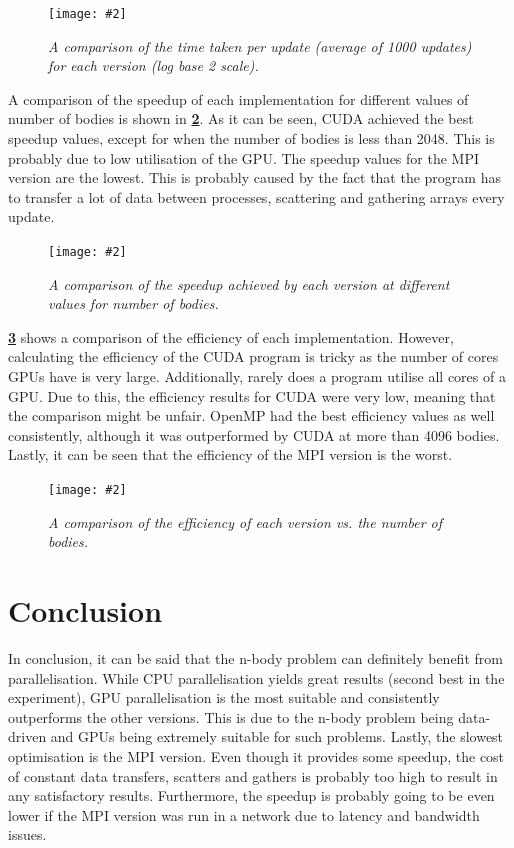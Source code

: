 \documentclass[12pt, a4paper]{article}
\newcommand{\figuremacro}[5]{
    \begin{figure}[#1]
        \centering
        \caption[#3]{\textbf{#3}#4}
        \texttt{[image: \#2]}
        \label{fig:#2}
    \end{figure}
}
\begin{document}
    \figuremacro{h}{avg_times}{}{\small{\textit{A comparison of the time taken per update (average of 1000 updates) for each version (log base 2 scale).}}}{1}    

    A comparison of the speedup of each implementation for different values of number of bodies is shown in \textbf{\cref{fig:speedup}}. As it can be seen, CUDA achieved the best speedup values, except for when the number of bodies is less than 2048. This is probably due to low utilisation of the GPU. The speedup values for the MPI version are the lowest. This is probably caused by the fact that the program has to transfer a lot of data between processes, scattering and gathering arrays every update.

    \figuremacro{h}{speedup}{}{\small{\textit{A comparison of the speedup achieved by each version at different values for number of bodies.}}}{1}    

    \textbf{\cref{fig:efficiency}} shows a comparison of the efficiency of each implementation. However, calculating the efficiency of the CUDA program is tricky as the number of cores GPUs have is very large. Additionally, rarely does a program utilise all cores of a GPU. Due to this, the efficiency results for CUDA were very low, meaning that the comparison might be unfair. OpenMP had the best efficiency values as well consistently, although it was outperformed by CUDA at more than 4096 bodies. Lastly, it can be seen that the efficiency of the MPI version is the worst.

    \figuremacro{h}{efficiency}{}{\small{\textit{A comparison of the efficiency of each version vs. the number of bodies.}}}{1}

    \section{Conclusion}
    In conclusion, it can be said that the n-body problem can definitely benefit from parallelisation. While CPU parallelisation yields great results (second best in the experiment), GPU parallelisation is the most suitable and consistently outperforms the other versions. This is due to the n-body problem being data-driven and GPUs being extremely suitable for such problems. Lastly, the slowest optimisation is the MPI version. Even though it provides some speedup, the cost of constant data transfers, scatters and gathers is probably too high to result in any satisfactory results. Furthermore, the speedup is probably going to be even lower if the MPI version was run in a network due to latency and bandwidth issues. 
\end{document}

